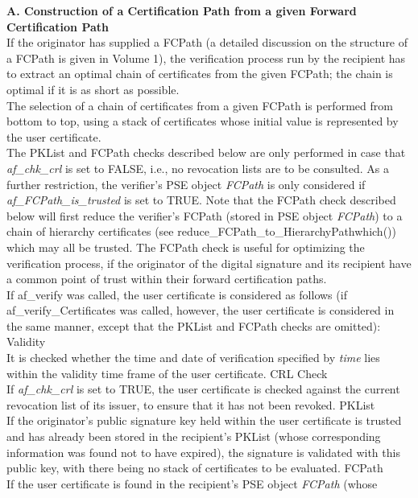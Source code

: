 {\bf A. Construction of a Certification Path from a given Forward Certification Path}
\\ [1em]
If the originator has supplied a FCPath (a detailed discussion on the structure 
of a FCPath is given in Volume 1), the verification
process run by the recipient has to extract an optimal chain of certificates 
from the given FCPath; the chain is optimal if it is as short as possible.
\\ [1em]
The selection of a chain of certificates from a given FCPath is performed
from bottom to top, using a stack of certificates whose initial value
is represented by the user certificate.
\\ [1em]
The PKList and FCPath checks described below are only performed in case that {\em af\_chk\_crl}
is set to FALSE, i.e., no revocation lists are to be consulted. As a further restriction, 
the verifier's PSE object {\em FCPath} is only
considered if {\em af\_FCPath\_is\_trusted} is set to TRUE. Note that the
FCPath check described below will first reduce the verifier's FCPath (stored in PSE object
{\em FCPath}) to a chain of hierarchy certificates (see reduce\_FCPath\_to\_HierarchyPathwhich()) 
which may all be trusted. The FCPath check is useful for optimizing the verification process,
if the originator of the digital signature and its recipient have a common point of trust
within their forward certification paths.
\\ [1em]
If af\_verify was called, the user certificate is considered as follows (if
af\_verify\_Certificates was called, however, the user certificate is considered in the
same manner, except that the PKList and FCPath checks are omitted):
\be
\m Validity \\
It is checked whether the time and date of verification specified by {\em time} lies 
within the validity time frame of the user certificate.
\m CRL Check \\
If {\em af\_chk\_crl} is set to TRUE, the user certificate is checked against the current 
revocation list of its issuer, to ensure that it has not been revoked.
\m PKList \\
If the originator's public signature key held within the user certificate
is trusted and has already been stored in the recipient's PKList (whose
corresponding information was found not to have expired),
the signature is validated with this public key, with there being no stack of 
certificates to be evaluated.
\m FCPath \\
If the user certificate is found in the recipient's PSE object {\em FCPath} (whose
